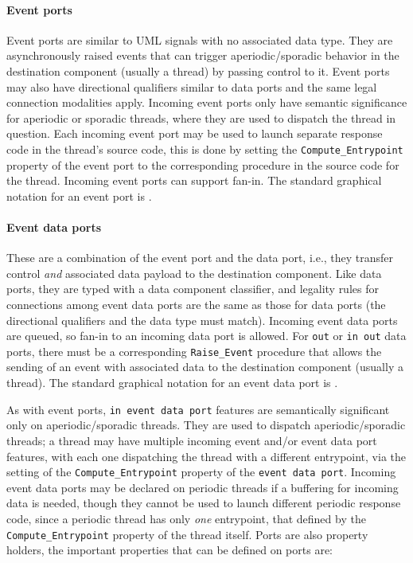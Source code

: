 \paragraph{Event ports} Event ports are similar to UML signals with no
associated data type. They are asynchronously raised events that can
trigger aperiodic/sporadic behavior in the destination component
(usually a thread) by passing control to it. Event ports may also have
directional qualifiers similar to data ports and the same legal
connection modalities apply. Incoming event ports only have semantic
significance for aperiodic or sporadic threads, where they are used to
dispatch the thread in question. Each incoming event port may be used
to launch separate response code in the thread's source code, this is
done by setting the \texttt{Compute\_Entrypoint} property of the event
port to the corresponding procedure in the source code for the
thread. Incoming event ports can support fan-in. The standard
graphical notation for an event port is \eventport.

\paragraph{Event data ports} These are a combination of the event port
and the data port, i.e., they transfer control \emph{and} associated
data payload to the destination component. Like data ports, they are
typed with a data component classifier, and legality rules for
connections among event data ports are the same as those for data
ports (the directional qualifiers and the data type must
match). Incoming event data ports are queued, so fan-in to an incoming
data port is allowed. For \texttt{out} or \texttt{in out} data ports,
there must be a corresponding \texttt{Raise\_Event} procedure that
allows the sending of an event with associated data to the destination
component (usually a thread). The standard graphical notation for an
event data port is \eventdataport.

As with event ports, \texttt{in event data port} features are
semantically significant only on aperiodic/sporadic threads. They are
used to dispatch aperiodic/sporadic threads; a thread may have
multiple incoming event and/or event data port features, with each one
dispatching the thread with a different entrypoint, via the setting of
the \texttt{Compute\_Entrypoint} property of the \texttt{event data
  port}. Incoming event data ports may be declared on periodic threads
if a buffering for incoming data is needed, though they cannot be used
to launch different periodic response code, since a periodic thread
has only \emph{one} entrypoint, that defined by the
\texttt{Compute\_Entrypoint} property of the thread itself. Ports are
also property holders, the important properties that can be defined on
ports are:

